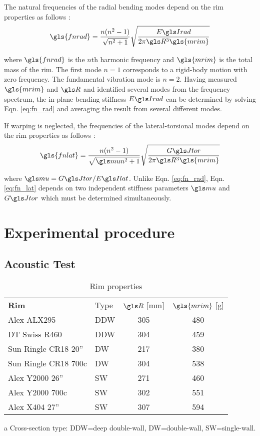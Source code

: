 \documentclass[../thesis.tex]{subfiles}
\begin{document}
The natural frequencies of the radial bending modes depend on the rim properties as follows \cite{Timoshenko1955}:
\begin{equation}\label{eq:fn_rad}
\gls{fnrad} = \frac{n(n^2-1)}{\sqrt{n^2+1}} \sqrt{\frac{\EIr}{2\pi \R^3 \gls{mrim}}}
\end{equation}

where $\gls{fnrad}$ is the $n$th harmonic frequency and $\gls{mrim}$ is the total mass of the rim. The first mode $n=1$ corresponds to a rigid-body motion with zero frequency. The fundamental vibration mode is $n=2$. Having measured $\gls{mrim}$ and $\R$ and identified several modes from the frequency spectrum, the in-plane bending stiffness $\EIr$ can be determined by solving Eqn. \eqref{eq:fn_rad} and averaging the result from several different modes.

If warping is neglected, the frequencies of the lateral-torsional modes depend on the rim properties as follows \cite{Timoshenko1955}:
\begin{equation}\label{eq:fn_lat}
\gls{fnlat} = \frac{n(n^2-1)}{\sqrt{\m n^2+1}} \sqrt{\frac{\GJ}{2\pi \R^3 \gls{mrim}}}
\end{equation}

where $\m=\GJ/\EIl$. Unlike Eqn. \eqref{eq:fn_rad}, Eqn. \eqref{eq:fn_lat} depends on two independent stiffness parameters $\m$ and $\GJ$ which must be determined simultaneously.


\section{Experimental procedure}

\subsection{Acoustic Test}

\begin{table}
\caption[Properties of rims for acoustic testing]{Rim properties}
\begin{threeparttable}
\begin{tabular}{llcc}
\toprule
\bf{Rim} & Type\tnote{a} & $\R$ [mm] & $\gls{mrim}$ [g]\\
\noalign{\smallskip}\hline\noalign{\smallskip}
Alex ALX295          & DDW & 305 & 480\\
DT Swiss R460        & DDW & 304 & 459\\
Sun Ringle CR18 20'' & DW  & 217 & 380\\
Sun Ringle CR18 700c & DW  & 304 & 538\\
Alex Y2000 26''      & SW  & 271 & 460\\
Alex Y2000 700c      & SW  & 302 & 551\\
Alex X404 27''       & SW  & 307 & 594\\
\bottomrule
\end{tabular}
\begin{tablenotes}
\small
\item [a] Cross-section type: DDW=deep double-wall, DW=double-wall, SW=single-wall.
\end{tablenotes}
\end{threeparttable}
\end{table}
\end{document}
